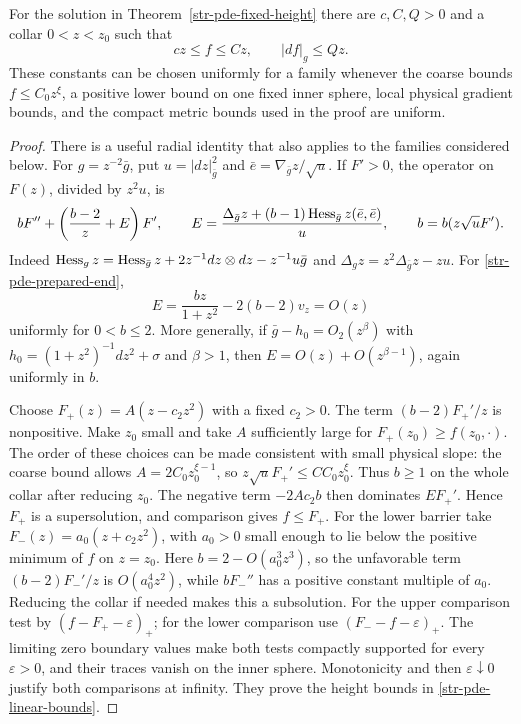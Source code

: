 \begin{lemma}
\label{str-pde-linear-end-bounds}
For the solution in Theorem~\ref{str-pde-fixed-height} there are
$c,C,Q>0$ and a collar $0<z<z_0$ such that
\begin{equation}\label{str-pde-linear-bounds}
 cz\leq f\leq Cz,\qquad |df|_g\leq Qz.
\end{equation}
These constants can be chosen uniformly for a family whenever
the coarse bounds $f\leq C_0z^\xi$, a positive lower bound on one
fixed inner sphere, local physical gradient bounds, and the
compact metric bounds used in the proof are uniform.
\end{lemma}
\begin{proof}
There is a useful radial identity that also applies to the
families considered below. For $g=z^{-2}\bar g$, put
$u=|dz|_{\bar g}^2$ and
$\bar e=\nabla_{\bar g}z/\sqrt u$. If $F'>0$, the operator on
$F(z)$, divided by $z^2u$, is
\begin{equation}\label{str-pde-compact-radial}
 bF''+\left(\frac{b-2}{z}+E\right)F',\qquad
 E=\frac{\Delta_{\bar g}z+(b-1)\operatorname{Hess}_{\bar g}z(\bar e,\bar e)}u,
 \qquad b=b(z\sqrt u F').
\end{equation}
Indeed
$\operatorname{Hess}_g z=\operatorname{Hess}_{\bar g}z+
 2z^{-1}dz\otimes dz-z^{-1}u\bar g$ and
$\Delta_g z=z^2\Delta_{\bar g}z-zu$.
For \eqref{str-pde-prepared-end},
\[
 E=\frac{b z}{1+z^2}-2(b-2)v_z=O(z)
\]
uniformly for $0<b\leq2$. More generally, if
$\bar g-h_0=O_2(z^\beta)$ with
$h_0=(1+z^2)^{-1}dz^2+\sigma$ and $\beta>1$, then
$E=O(z)+O(z^{\beta-1})$, again uniformly in $b$.

Choose $F_+(z)=A(z-c_2z^2)$ with a fixed $c_2>0$.
The term $(b-2)F_+'/z$ is nonpositive. Make $z_0$ small
and take $A$ sufficiently large for $F_+(z_0)\geq f(z_0,\cdot)$.
The order of these choices can be made consistent with small
physical slope: the coarse bound allows
$A=2C_0z_0^{\xi-1}$, so $z\sqrt u F_+'\leq C C_0z_0^\xi$.
Thus $b\geq1$ on the whole collar after reducing $z_0$.
The negative term $-2Ac_2b$ then dominates $E F_+'$.
Hence $F_+$ is a supersolution, and comparison gives $f\leq F_+$.
For the lower barrier take $F_-(z)=a_0(z+c_2z^2)$, with $a_0>0$
small enough to lie below the positive minimum of $f$ on
$z=z_0$. Here $b=2-O(a_0^3z^3)$, so the unfavorable term
$(b-2)F_-'/z$ is $O(a_0^4z^2)$, while $bF_-''$
has a positive constant multiple of $a_0$. Reducing the collar
if needed makes this a subsolution. For the upper comparison test by $(f-F_+-\varepsilon)_+$;
for the lower comparison use $(F_--f-\varepsilon)_+$.
The limiting zero boundary values make both tests compactly
supported for every $\varepsilon>0$, and their traces vanish
on the inner sphere. Monotonicity and then
$\varepsilon\downarrow0$ justify both comparisons at infinity.
They prove the height bounds in \eqref{str-pde-linear-bounds}.


\end{proof}
